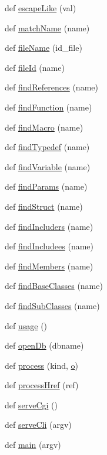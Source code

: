\begin{DoxyCompactItemize}
\item 
def \hyperlink{namespacesearch_a8ca61b1cc505278f8f164b4d83495cc5}{escape\+Like} (val)
\item 
def \hyperlink{namespacesearch_a04db1d4c0cda1a029a24b380cf8c3986}{match\+Name} (name)
\item 
def \hyperlink{namespacesearch_a92f179390c7a21e9abe9454e954b70ab}{file\+Name} (id\+\_\+file)
\item 
def \hyperlink{namespacesearch_a9d37b985db0a6e85e541009a2bf0e41b}{file\+Id} (name)
\item 
def \hyperlink{namespacesearch_aedc681359d2af24f46373f9abfac4f59}{find\+References} (name)
\item 
def \hyperlink{namespacesearch_a90490591d1052bc7184c8ead2f7cf013}{find\+Function} (name)
\item 
def \hyperlink{namespacesearch_a6dd7f46f7b1d37dce8a3c12b5750e240}{find\+Macro} (name)
\item 
def \hyperlink{namespacesearch_a65c75ce30b82d50625e1bccf02f22261}{find\+Typedef} (name)
\item 
def \hyperlink{namespacesearch_aaa25f518493ded0bb28a109995bd48b7}{find\+Variable} (name)
\item 
def \hyperlink{namespacesearch_a0c3b7e3038c7e18d14bc388b058abda2}{find\+Params} (name)
\item 
def \hyperlink{namespacesearch_a285058028eca1252e5dbea55cff9aa18}{find\+Struct} (name)
\item 
def \hyperlink{namespacesearch_aabcae6a829ee39d6d685286fbf15f553}{find\+Includers} (name)
\item 
def \hyperlink{namespacesearch_adf039a41d5139e6e3fbb0db676a10fcb}{find\+Includees} (name)
\item 
def \hyperlink{namespacesearch_ab41d4f981f164183a2e4ed5baf32b1c0}{find\+Members} (name)
\item 
def \hyperlink{namespacesearch_a6a221d0dea2c97d246aa4731b8c83b24}{find\+Base\+Classes} (name)
\item 
def \hyperlink{namespacesearch_a20b0f2ef4044f68f480ebb9b29006919}{find\+Sub\+Classes} (name)
\item 
def \hyperlink{namespacesearch_ad8e59ce9a92ac62d59c4c30ae934dd54}{usage} ()
\item 
def \hyperlink{namespacesearch_a778d835e55bd18bdf04c4d12346c8182}{open\+Db} (dbname)
\item 
def \hyperlink{namespacesearch_a086e297e46cc8be0240f6b4472b8c789}{process} (kind, \hyperlink{060__command__switch_8tcl_a495e7a4ede0831107e9d435080a7c268}{o})
\item 
def \hyperlink{namespacesearch_aa3d37421362b497e357224cb592cf183}{process\+Href} (ref)
\item 
def \hyperlink{namespacesearch_a0c7f7f1b13eb2277c1574438fe0ac937}{serve\+Cgi} ()
\item 
def \hyperlink{namespacesearch_a167bb074fa9653cc2bee323622a45869}{serve\+Cli} (argv)
\item 
def \hyperlink{namespacesearch_aded2cd65a8c76b178c8ff4a7a61c2501}{main} (argv)
\end{DoxyCompactItemize}


